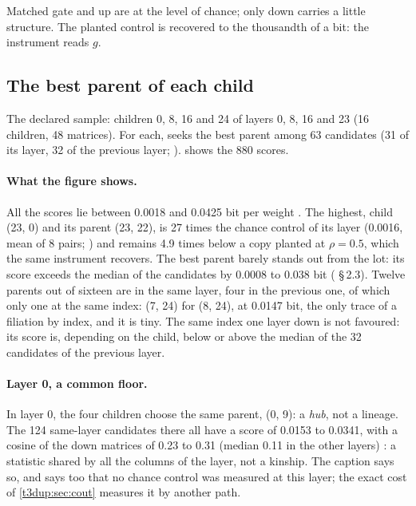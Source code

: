 Matched gate and up are at the level of chance; only down carries a little structure. The planted control is recovered to the thousandth of a bit: the instrument reads $g$.

\subsection{The best parent of each child}

The declared sample: children 0, 8, 16 and 24 of layers 0, 8, 16 and 23 (16 children, 48 matrices). For each,  seeks the best parent among 63 candidates (31 of its layer, 32 of the previous layer; ).  shows the 880 scores.

\begin{figure}[tbp]
\centering
\GrapheDupParente
{}
\label{fig:t3-dup-parente}
\end{figure}

\paragraph{What the figure shows.} All the scores lie between 0.0018 and 0.0425 bit per weight \mes. The highest, child (23, 0) and its parent (23, 22), is 27 times the chance control of its layer (0.0016, mean of 8 pairs; ) and remains 4.9 times below a copy planted at $\rho = 0.5$, which the same instrument recovers. The best parent barely stands out from the lot: its score exceeds the median of the candidates by 0.0008 to 0.038 bit ( §\,2.3). Twelve parents out of sixteen are in the same layer, four in the previous one, of which only one at the same index: (7, 24) for (8, 24), at 0.0147 bit, the only trace of a filiation by index, and it is tiny. The same index one layer down is not favoured: its score is, depending on the child, below or above the median of the 32 candidates of the previous layer.

\paragraph{Layer 0, a common floor.} In layer 0, the four children choose the same parent, (0, 9): a \emph{hub}, not a lineage. The 124 same-layer candidates there all have a score of 0.0153 to 0.0341, with a cosine of the down matrices of 0.23 to 0.31 (median 0.11 in the other layers) \mes: a statistic shared by all the columns of the layer, not a kinship. The caption says so, and says too that no chance control was measured at this layer; the exact cost of \cref{t3dup:sec:cout} measures it by another path.

